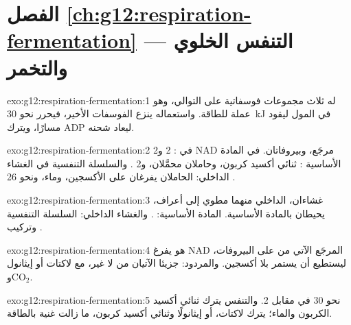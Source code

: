 \section*{الفصل \ref{ch:g12:respiration-fermentation} --- التنفس الخلوي والتخمر}

\begin{solution}{exo:g12:respiration-fermentation:1}
 له ثلاث مجموعات فوسفاتية على التوالي، وهو عملة 
للطاقة. واستعماله ينزع الفوسفات الأخير، فيحرر نحو \qty{30}{kJ} في
المول ليقود مسارًا، ويترك ADP ليعاد شحنه.
\end{solution}

\begin{solution}{exo:g12:respiration-fermentation:2}
 في : 2  و2 NAD مرجَع، وبيروفاتان.  في المادة الأساسية : ثنائي أكسيد كربون، وحاملان
محمَّلان، و2 . والسلسلة التنفسية في الغشاء الداخلي: الحاملان
يفرغان على الأكسجين، وماء، ونحو 26 .
\end{solution}

\begin{solution}{exo:g12:respiration-fermentation:3}
غشاءان، الداخلي منهما مطوي إلى أعراف، يحيطان بالمادة الأساسية. المادة
الأساسية: . والغشاء الداخلي: السلسلة التنفسية وتركيب .
\end{solution}

\begin{solution}{exo:g12:respiration-fermentation:4}
هو يفرغ NAD المرجَع الآتي من  على البيروفات، ليستطيع  أن يستمر بلا أكسجين. والمردود: جزيئا  الآتيان من 
لا غير، مع لاكتات أو إيثانول و$\mathrm{CO_2}$.
\end{solution}

\begin{solution}{exo:g12:respiration-fermentation:5}
نحو 30  في مقابل 2. والتنفس يترك ثنائي أكسيد الكربون والماء؛
 يترك لاكتات، أو إيثانولًا وثنائي أكسيد كربون، ما زالت غنية
بالطاقة.
\end{solution}

